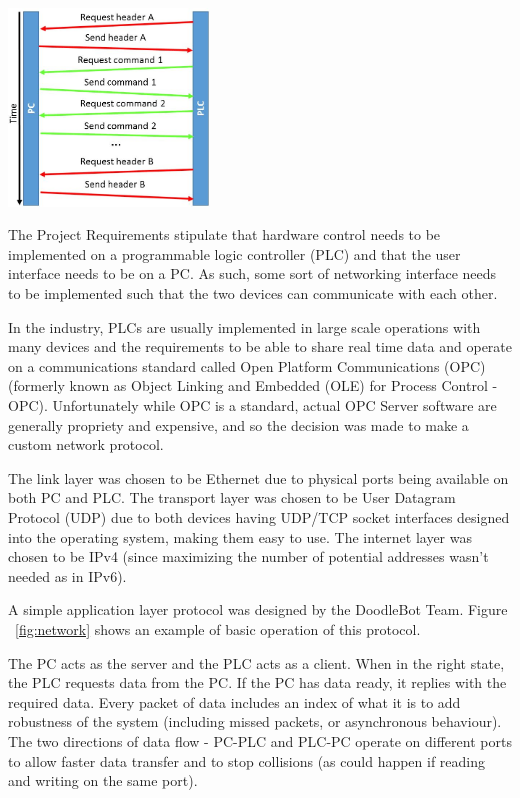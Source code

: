 \begin{center}
	\includegraphics[width=0.4\textwidth]{figures/systemDesign/network.jpg}
	\label{fig:network}
\end{center}

The Project Requirements stipulate that hardware control needs to be implemented on a programmable logic controller (PLC) and that the user interface needs to be on a PC. As such, some sort of networking interface needs to be implemented such that the two devices can communicate with each other. 

In the industry, PLCs are usually implemented in large scale operations with many devices and the requirements to be able to share real time data and operate on a communications standard called Open Platform Communications (OPC) (formerly known as Object Linking and Embedded (OLE) for Process Control - OPC). Unfortunately while OPC is a standard, actual OPC Server software are generally propriety and expensive, and so the decision was made to make a custom network protocol.

The link layer was chosen to be Ethernet due to physical ports being available on both PC and PLC. The transport layer was chosen to be User Datagram Protocol (UDP) due to both devices having UDP/TCP socket interfaces designed into the operating system, making them easy to use. The internet layer was chosen to be IPv4 (since maximizing the number of potential addresses wasn't needed as in IPv6).

A simple application layer protocol was designed by the DoodleBot Team. Figure ~\ref{fig:network} shows an example of basic operation of this protocol. 

The PC acts as the server and the PLC acts as a client. When in the right state, the PLC requests data from the PC. If the PC has data ready, it replies with the required data. Every packet of data includes an index of what it is to add robustness of the system (including missed packets, or asynchronous behaviour). The two directions of data flow - PC-PLC and PLC-PC operate on different ports to allow faster data transfer and to stop collisions (as could happen if reading and writing on the same port).

